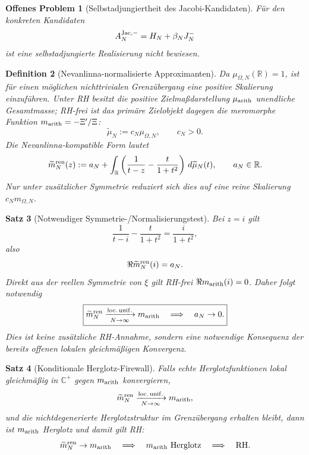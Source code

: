 \documentclass[11pt,a4paper]{amsart}
\newtheorem{theorem}{Satz}[section]
\newtheorem{definition}[theorem]{Definition}
\newtheorem{openproblem}[theorem]{Offenes Problem}
\newcommand{\RH}{\mathrm{RH}}
\begin{document}
\begin{openproblem}[Selbstadjungiertheit des Jacobi-Kandidaten]
\label{op:jacobi-selfadjoint}
Für den konkreten Kandidaten
\[
  A_N^{\rm Jac,-}=H_N+\beta_NJ_N^-
\]
ist eine selbstadjungierte Realisierung nicht bewiesen.
\end{openproblem}

\begin{definition}[Nevanlinna-normalisierte Approximanten]
\label{def:renorm-approximants}
Da $\mu_{\Omega,N}(\mathbb R)=1$, ist für einen möglichen nichttrivialen
Grenzübergang eine positive Skalierung einzuführen. Unter RH besitzt die
positive Zielmaßdarstellung $\mu_{\rm arith}$ unendliche Gesamtmasse; RH-frei
ist das primäre Zielobjekt dagegen die meromorphe Funktion
$m_{\rm arith}=-\Xi'/\Xi$:
\[
  \widetilde\mu_N:=c_N\mu_{\Omega,N},
  \qquad c_N>0.
\]
Die Nevanlinna-kompatible Form lautet
\[
  \widetilde m_N^{\rm ren}(z)
  :=a_N+\int_{\mathbb R}
  \left(\frac1{t-z}-\frac{t}{1+t^2}\right)\,d\widetilde\mu_N(t),
  \qquad a_N\in\mathbb R.
\]
Nur unter zusätzlicher Symmetrie reduziert sich dies auf eine reine Skalierung
$c_Nm_{\Omega,N}$.
\end{definition}

\begin{theorem}[Notwendiger Symmetrie-/Normalisierungstest]
\label{thm:aN-zero}
Bei $z=i$ gilt
\[
  \frac1{t-i}-\frac{t}{1+t^2}=\frac{i}{1+t^2},
\]
also
\[
  \Re\widetilde m_N^{\rm ren}(i)=a_N.
\]
Direkt aus der reellen Symmetrie von $\xi$ gilt RH-frei
$\Re m_{\rm arith}(i)=0$. Daher folgt notwendig
\[
  \boxed{
  \widetilde m_N^{\rm ren}
  \xrightarrow[N\to\infty]{\rm loc.\,unif.}m_{\rm arith}
  \quad\Longrightarrow\quad a_N\to0.}
\]
Dies ist keine zusätzliche RH-Annahme, sondern eine notwendige Konsequenz der
bereits offenen lokalen gleichmäßigen Konvergenz.
\end{theorem}

\begin{theorem}[Konditionale Herglotz-Firewall]
\label{thm:conditional-firewall}
Falls echte Herglotzfunktionen lokal gleichmäßig in $\mathbb C^+$ gegen
$m_{\rm arith}$ konvergieren,
\[
  \widetilde m_N^{\rm ren}
  \xrightarrow[N\to\infty]{\rm loc.\,unif.}
  m_{\rm arith},
\]
und die nichtdegenerierte Herglotzstruktur im Grenzübergang erhalten bleibt,
dann ist $m_{\rm arith}$ Herglotz und damit gilt RH:
\[
  \widetilde m_N^{\rm ren}\to m_{\rm arith}
  \quad\Longrightarrow\quad
  m_{\rm arith}\text{ Herglotz}
  \quad\Longrightarrow\quad
  \RH.
\]
\end{theorem}
\end{document}
